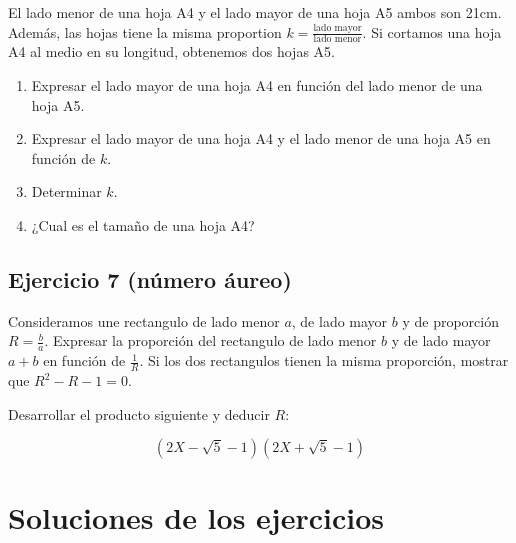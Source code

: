\begin{center}
\end{center}

El lado menor de una hoja A4 y el lado mayor de una hoja A5 ambos son 21cm.
Además, las hojas tiene la misma proportion
$k = \frac{\text{lado mayor}}{\text{lado menor}}$. Si cortamos una hoja A4
al medio en su longitud, obtenemos dos hojas A5.

\begin{enumerate}
\item Expresar el lado mayor de una hoja A4 en función del lado menor de una
      hoja A5.
\item Expresar el lado mayor de una hoja A4 y el lado menor de una hoja A5 en
      función de $k$.
\item Determinar $k$.
\item ¿Cual es el tamaño de una hoja A4?
\end{enumerate}

\subsection*{Ejercicio 7 (número áureo)}

\begin{center}
\end{center}

Consideramos une rectangulo de lado menor $a$, de lado mayor $b$ y de
proporción $R = \frac{b}{a}$. Expresar la proporción del rectangulo de lado
menor $b$ y de lado mayor $a+b$ en función de $\frac{1}{R}$. Si los dos
rectangulos tienen la misma proporción, mostrar que $R^2 - R - 1 = 0$.

Desarrollar el producto siguiente y deducir $R$:

$$\left(2X-\sqrt{5}-1\right) \left(2X+\sqrt{5}-1\right)$$

\section{Soluciones de los ejercicios}

